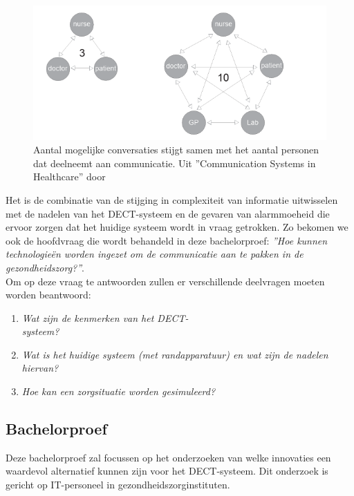 \begin{figure}[h]
  \includegraphics[width=\linewidth]{../graphics/Number-of-conversations.png}
  \caption{Aantal mogelijke conversaties stijgt samen met het aantal personen dat deelneemt aan communicatie. Uit ''Communication Systems in Healthcare'' door \autocite{Coiera2006}}
  \label{fig:voorstel aantal conversaties}
\end{figure}

Het is de combinatie van de stijging in complexiteit van informatie uitwisselen met de nadelen van het DECT-systeem en de gevaren van alarmmoeheid die ervoor zorgen dat het huidige systeem wordt in vraag getrokken. Zo bekomen we ook de hoofdvraag die wordt behandeld in deze bachelorproef: \textit{''Hoe kunnen technologieën worden ingezet om de communicatie aan te pakken in de gezondheidszorg?''}.\\

Om op deze vraag te antwoorden zullen er verschillende deelvragen moeten worden beantwoord:
\begin{enumerate}
  \item \textit{Wat zijn de kenmerken van het DECT-\\systeem?}
  \item \textit{Wat is het huidige systeem (met randapparatuur) en wat zijn de nadelen hiervan?}
  \item \textit{Hoe kan een zorgsituatie worden gesimuleerd?}
\end{enumerate}

\subsection{Bachelorproef}
Deze bachelorproef zal focussen op het onderzoeken van welke innovaties een waardevol alternatief kunnen zijn voor het DECT-systeem. Dit onderzoek is gericht op IT-personeel in gezondheidszorginstituten.\\\\

